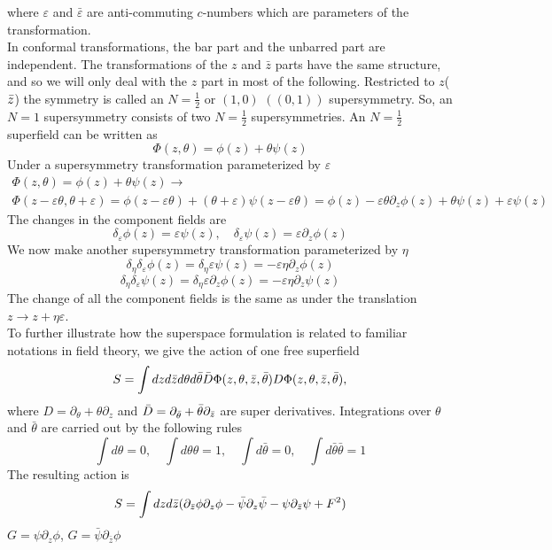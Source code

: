 \documentclass[12pt]{article}
\theoremstyle{definition}
\begin{document}
where $\varepsilon$ and $\bar{\varepsilon}$ are anti-commuting $c$-numbers which are parameters of the transformation.\\
In conformal transformations, the bar part and the unbarred part are independent. The transformations of the $z$ and $\bar{z}$ parts have the same structure, and so we will only deal with the $z$ part in most of the following. Restricted to $z$($\Bar{z}$) the symmetry is called an $N = \frac{1}{2}$ or $(1,0)$ $((0,1))$ supersymmetry. So, an $N = 1$ supersymmetry consists of two $N=\frac{1}{2}$ supersymmetries. An $N = \frac{1}{2}$
superfield can be written as
\begin{equation}
    \Phi(z,\theta)=\phi(z)+\theta\psi(z)
\end{equation}
Under a supersymmetry transformation parameterized by $\varepsilon$
\begin{multline}
    \Phi(z,\theta)=\phi(z)+\theta\psi(z)\rightarrow\\\Phi(z-\varepsilon\theta,\theta+\varepsilon)=\phi(z-\varepsilon\theta)+(\theta+\varepsilon)\psi(z-\varepsilon\theta)=\phi(z)-\varepsilon\theta\partial_z\phi(z)+\theta\psi(z)+\varepsilon\psi(z)
\end{multline}
The changes in the component fields are 
\begin{equation}
    \delta_\varepsilon\phi(z)=\varepsilon\psi(z),\quad\delta_\varepsilon\psi(z)=\varepsilon\partial_z\phi(z)
\end{equation}
We now make another supersymmetry transformation parameterized by $\eta$
\begin{equation}
    \delta_\eta\delta_\varepsilon\phi(z)=\delta_\eta\varepsilon\psi(z)=-\varepsilon\eta\partial_z\phi(z)
\end{equation}
\begin{equation}
    \delta_\eta\delta_\varepsilon\psi(z)=\delta_\eta\varepsilon\partial_z\phi(z)=-\varepsilon\eta\partial_z\psi(z)
\end{equation}
The change of all the component fields is the same as under the translation $z\rightarrow z+\eta\varepsilon$.\\
To further illustrate how the superspace formulation is related to familiar notations in field theory, we give the action of one free superfield
\begin{equation}
    S=\int dzd\bar{z}d\theta d\bar{\theta}\bar{D}\Phi(z,\theta,\bar{z},\Bar{\theta})D\Phi(z,\theta,\bar{z},\Bar{\theta}),
\end{equation}
where $D = \partial_\theta + \theta\partial_z$ and $\bar{D} = \partial_{\bar{\theta}} + \Bar{\theta}\partial_{\Bar{z}}$ are super derivatives. Integrations over $\theta$ and $\bar{\theta}$ are carried out by the following rules
\begin{equation}
    \int d\theta=0,\quad\int d\theta\theta=1,\quad\int d\bar{\theta}=0,\quad\int d\bar{\theta}\bar{\theta}=1
\end{equation}
The resulting action is 
\begin{equation}
    S=\int dzd\bar{z}(\partial_{\bar{z}}\phi\partial_z\phi-\Bar{\psi}\partial_z\Bar{\psi}-\psi\partial_{\bar{z}}\psi+F^2)
\end{equation}
$G=\psi\partial_{z}\phi$, $G=\bar{\psi}\partial_{\bar{z}}\phi$
\end{document}
